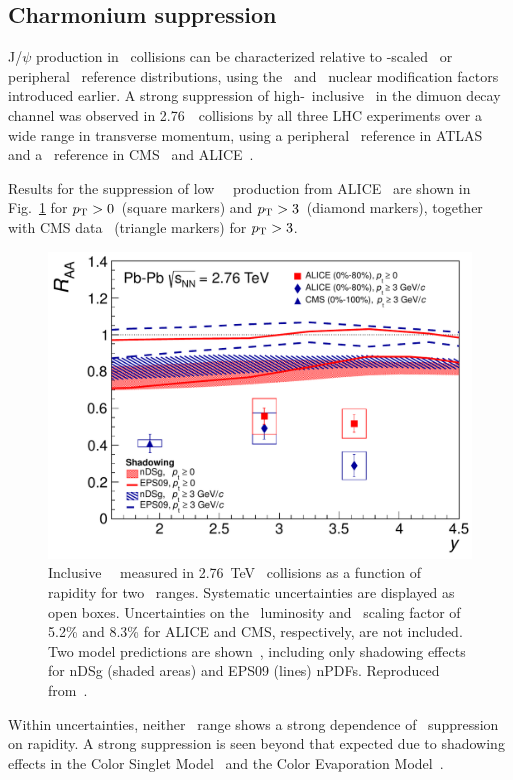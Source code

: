 \subsection{Charmonium suppression}

J/$\psi$ production in \PbPb\ collisions can be characterized relative to \Ncoll-scaled \pp\ or 
peripheral \PbPb\ reference
distributions, using the \Raa\ and \Rcp\ nuclear modification factors introduced earlier.
A strong suppression of high-\pT\ inclusive \jpsi\ in the dimuon decay channel 
was observed in 2.76\TeV\ \PbPb\ collisions by all three LHC experiments over a wide 
range in transverse momentum, using a peripheral \PbPb\ reference in ATLAS~\cite{Aad:2010aa} 
and a \pp\ reference in CMS~\cite{Chatrchyan:2012np} and ALICE~\cite{Abelev:2012rv}.

Results for the suppression of low \pT\ \jpsi\ production from ALICE~\cite{Abelev:2012rv} are shown
in Fig.~\ref{fig:GR:raavsy} for $\mbox{$p_{\mathrm{T}}$} > 0$\GeVc\ (square markers) and
$\mbox{$p_{\mathrm{T}}$} > 3$\GeVc\ (diamond markers), together with CMS data~\cite{Chatrchyan:2012np} (triangle markers)
for $\mbox{$p_{\mathrm{T}}$} > 3$\GeVc.

\begin{figure}
\begin{center}
\includegraphics[width=0.49\linewidth]{qqbarfigures/RAAvsY_v7-eps-converted-to.pdf}
\caption{ \label{fig:GR:raavsy}  Inclusive \jpsi\ \Raa\ measured in 2.76~TeV \PbPb\
collisions as a function of  rapidity for two \pT\ ranges.
Systematic uncertainties are displayed as open boxes. 
Uncertainties on the \pp\ luminosity and \Taa\ scaling factor of
5.2\% and  8.3\% for ALICE and CMS, respectively, are not included.
Two model predictions are shown~\cite{Ferreiro:2011rw,Vogt:2010aa}, including only shadowing effects
for  nDSg (shaded areas) and EPS09 (lines) nPDFs. Reproduced from~\cite{Abelev:2012rv}.}
\end{center}
\end{figure}

Within uncertainties, neither \pT\ range shows a strong dependence of \jpsi\ suppression on rapidity.
A strong suppression is seen beyond that expected due to shadowing effects in the Color Singlet
Model~\cite{Ferreiro:2011rw} and the Color Evaporation Model~\cite{Vogt:2010aa}. 

